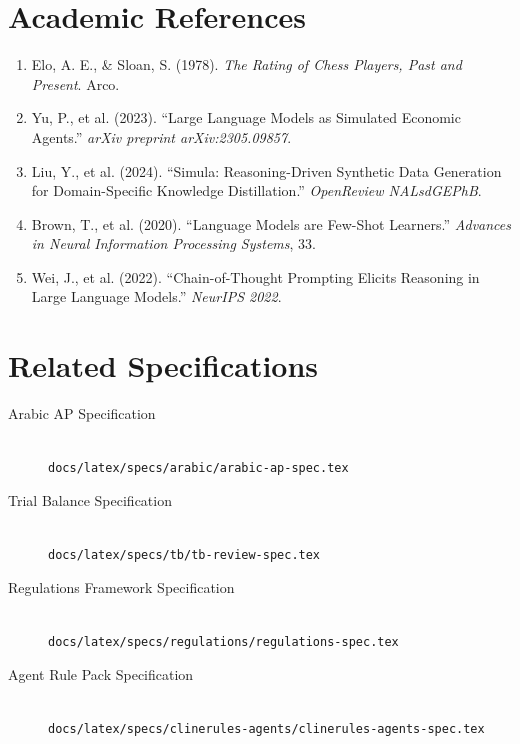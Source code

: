 \section{Academic References}

\begin{enumerate}
\item Elo, A. E., \& Sloan, S. (1978). \emph{The Rating of Chess Players, Past and Present}. Arco.

\item Yu, P., et al. (2023). ``Large Language Models as Simulated Economic Agents.'' 
      \emph{arXiv preprint arXiv:2305.09857}.

\item Liu, Y., et al. (2024). ``Simula: Reasoning-Driven Synthetic Data Generation for 
      Domain-Specific Knowledge Distillation.'' \emph{OpenReview NALsdGEPhB}.

\item Brown, T., et al. (2020). ``Language Models are Few-Shot Learners.'' 
      \emph{Advances in Neural Information Processing Systems}, 33.

\item Wei, J., et al. (2022). ``Chain-of-Thought Prompting Elicits Reasoning in Large 
      Language Models.'' \emph{NeurIPS 2022}.
\end{enumerate}

\section{Related Specifications}

\begin{description}
\item[Arabic AP Specification] \hfill \\
  \texttt{docs/latex/specs/arabic/arabic-ap-spec.tex}
  
\item[Trial Balance Specification] \hfill \\
  \texttt{docs/latex/specs/tb/tb-review-spec.tex}
  
\item[Regulations Framework Specification] \hfill \\
  \texttt{docs/latex/specs/regulations/regulations-spec.tex}
  
\item[Agent Rule Pack Specification] \hfill \\
  \texttt{docs/latex/specs/clinerules-agents/clinerules-agents-spec.tex}
\end{description}

